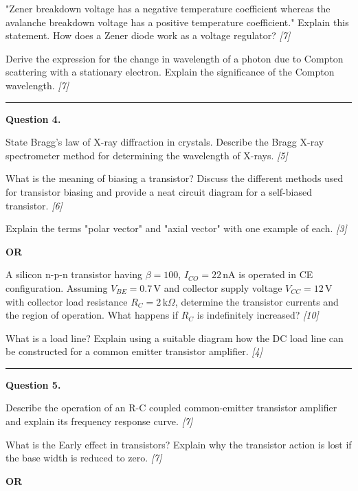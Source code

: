 \documentclass[11pt,a4paper]{article}
\newcommand{\pts}[1]{\hfill   \textit{[#1]}}
\begin{document}
\begin{parts}
  \item "Zener breakdown voltage has a negative temperature coefficient whereas the avalanche breakdown voltage has a positive temperature coefficient." Explain this statement. How does a Zener diode work as a voltage regulator? \pts{7}
  \item Derive the expression for the change in wavelength of a photon due to Compton scattering with a stationary electron. Explain the significance of the Compton wavelength. \pts{7}
\end{parts}

\medskip\rule{\linewidth}{0.2pt}

\medskip


\noindent   \textbf{Question 4.}

\begin{parts}
  \item State Bragg's law of X-ray diffraction in crystals. Describe the Bragg X-ray spectrometer method for determining the wavelength of X-rays. \pts{5}
  \item What is the meaning of biasing a transistor? Discuss the different methods used for transistor biasing and provide a neat circuit diagram for a self-biased transistor. \pts{6}
  \item Explain the terms "polar vector" and "axial vector" with one example of each. \pts{3}
\end{parts}
\hfill   \textbf{OR}

\begin{parts}
  \item A silicon n-p-n transistor having $\beta = 100$, $I_{CO} = 22\, \text{nA}$ is operated in CE configuration. Assuming $V_{BE} = 0.7\, \text{V}$ and collector supply voltage $V_{CC} = 12\, \text{V}$ with collector load resistance $R_C = 2\, \text{k}\Omega$, determine the transistor currents and the region of operation. What happens if $R_C$ is indefinitely increased? \pts{10}
  \item What is a load line? Explain using a suitable diagram how the DC load line can be constructed for a common emitter transistor amplifier. \pts{4}
\end{parts}

\medskip\rule{\linewidth}{0.2pt}

\medskip


\noindent   \textbf{Question 5.}

\begin{parts}
  \item Describe the operation of an R-C coupled common-emitter transistor amplifier and explain its frequency response curve. \pts{7}
  \item What is the Early effect in transistors? Explain why the transistor action is lost if the base width is reduced to zero. \pts{7}
\end{parts}
\hfill   \textbf{OR}
\end{document}
